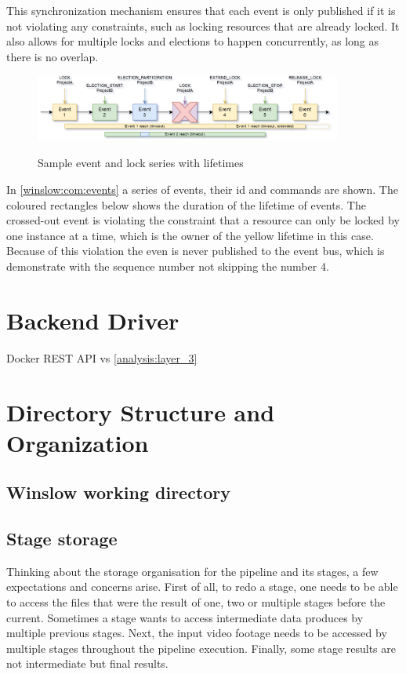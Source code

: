 This synchronization mechanism ensures that each event is only published if it is not violating any constraints, such as locking resources that are already locked.
It also allows for multiple locks and elections to happen concurrently, as long as there is no overlap.

\begin{figure}[H]
	\includegraphics[width=0.9\textwidth]{events.png}
	\label{winslow:com:events}
	\caption{Sample event and lock series with lifetimes}
\end{figure}

In \autoref{winslow:com:events} a series of events, their id and commands are shown.
The coloured rectangles below shows the duration of the lifetime of events.
The crossed-out event is violating the constraint that a resource can only be locked by one instance at a time, which is the owner of the yellow lifetime in this case.
Because of this violation the even is never published to the event bus, which is demonstrate with the sequence number not skipping the number 4.

\section{Backend Driver}

Docker REST API vs 
 \autoref{analysis:layer_3}


\section{Directory Structure and Organization}


\subsection{Winslow working directory}


\subsection{Stage storage}


Thinking about the storage organisation for the pipeline and its stages, a few expectations and concerns arise.
First of all, to redo a stage, one needs to be able to access the files that were the result of one, two or multiple stages before the current.
Sometimes a stage wants to access intermediate data produces by multiple previous stages.
Next, the input video footage needs to be accessed by multiple stages throughout the pipeline execution.
Finally, some stage results are not intermediate but final results.


